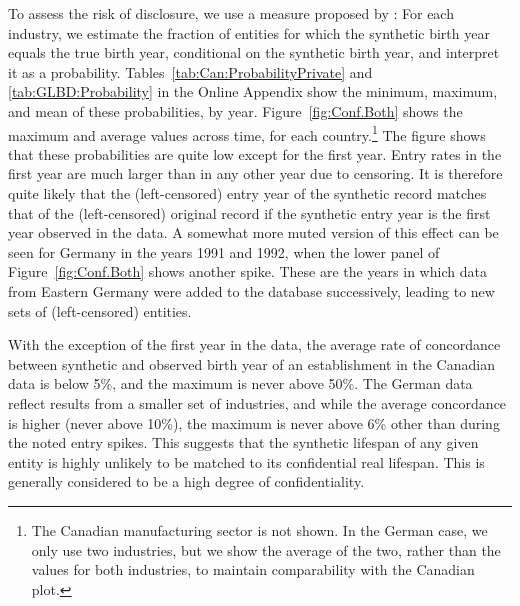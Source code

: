 
To assess the risk of disclosure, we use a measure proposed by \textcite{KinneyEtAl2011}: For each industry, we estimate the fraction of entities for which the synthetic birth year equals the true birth year, conditional on the synthetic birth year, and interpret it as a probability. Tables~\ref{tab:Can:ProbabilityPrivate} and \ref{tab:GLBD:Probability} in the Online Appendix show the minimum, maximum, and mean of these probabilities, by year. Figure~\ref{fig:Conf.Both} shows the maximum and average values across time, for each country.\footnote{The Canadian manufacturing sector is not shown. In the German case, we only use two industries, but we show the average of the two, rather than the values for both industries, to maintain comparability with the Canadian plot.} The figure shows that these probabilities are quite low except for the first year. Entry rates in the first year are much larger than in any other year due to censoring. It is therefore quite likely that the (left-censored) entry year of the synthetic record matches that of the (left-censored) original record if the synthetic entry year is the first year observed in the data. A somewhat more muted version of this effect can be seen for Germany in the years 1991 and 1992, when the lower panel of %
Figure~\ref{fig:Conf.Both} shows another spike. These are the years in which data from Eastern Germany were added to the database successively, leading to new sets of (left-censored) entities. 

With the exception of the first year in the data, the average rate of concordance between synthetic and observed birth year of an establishment in the Canadian data is below 5\%, and the maximum is never above 50\%. The German data reflect results from a smaller set of industries, and while the average concordance is higher (never above 10\%), the maximum is never above 6\% other than during the noted entry spikes. This suggests that the synthetic lifespan of any given entity is highly unlikely to be matched to its confidential real lifespan. This is generally considered to be a high degree of confidentiality. 






